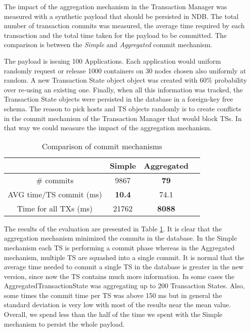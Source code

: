 The impact of the aggregation mechanism in the Transaction Manager was
measured with a synthetic payload that should be persisted in
NDB. The total number of transaction commits was measured,
the average time required by each transaction and the
total time taken for the payload to be committed. The comparison is
between the \emph{Simple} and \emph{Aggregated} commit mechanism.

The payload is issuing 100 Applications. Each application would
uniform randomly request or release 1000 containers on 30 nodes
chosen also uniformly at random. A new Transaction State object object
was created with 60$\%$ probability over re-using an existing
one. Finally, when all this information was tracked, the Transaction
State objects were persisted in the database in a foreign-key free
schema. The reason to pick hosts
and TS objects randomly is to create conflicts in the commit mechanism
of the Transaction Manager that would block TSs. In that way we could
measure the impact of the aggregation mechanism.

\begin{table}
\centering
\begin{tabular}{| c | c | c | c |}
\hline
  & Simple & Aggregated \\
\hline
\# commits & 9867 & \textbf{79} \\
\hline
AVG time/TS commit (ms) & \textbf{10.4} & 74.1 \\
\hline
Time for all TXs (ms) & 21762 & \textbf{8088} \\
\hline
\end{tabular}
\caption{Comparison of commit mechanisms}
\label{tab:ev_commit_mechanism}
\end{table}

The results of the evaluation are presented in Table
\ref{tab:ev_commit_mechanism}. It is clear that the aggregation
mechanism minimized the commits in the database. In the Simple mechanism
each TS is performing a commit phase whereas in the Aggregated mechanism,
multiple TS are squashed into a single commit. It is normal that the
average time needed to commit a single TS in the database is greater
in the new version, since now the TS contains much more
information. In some cases the AggregatedTransactionState was
aggregating up to 200 Transaction States. Also, some times the commit
time per TS was above 150 ms but in general the standard deviation is very low with
most of the results near the mean value. Overall, we spend less
than the half of the time we spent with the Simple mechanism to persist
the whole payload.